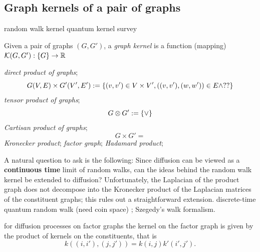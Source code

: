 \subsection{Graph kernels of a pair of graphs}
random walk kernel
\cite{vishwanathanGraphKernels2010}
quantum kernel
\cite{baiQuantumJensenShannon2015}
survey
\cite{kriegeSurveyGraphKernels2020}
\begin{definition}\label{def:graph_kernel}
	Given a pair of graphs $(G,G')$,
	a \emph{graph kernel} is a function (mapping)
	$\mathcal{K}(G,G'): \qty{ G} \to \mathbb{R}$
\end{definition}
\cite{chungSpectralGraphTheory1997}
\begin{definition}\label{def:product_graphs}
	\emph{direct product of graphs};
	\begin{equation}
		G(V,E)\times G'(V',E') 
		: = \qty{(v,v')\in V\times V',((v,v'),(w,w'))\in E \wedge??}
	\end{equation}
	\emph{tensor product of graphs};
	\begin{equation}
		G\otimes G' := \qty{ \vee }
	\end{equation}
	\emph{Cartisan product of graphs};
	\begin{equation}
		G\times G' = \qty{}
	\end{equation}
	\emph{Kronecker product};
	\emph{factor graph};
	\emph{Hadamard product};
\end{definition}
\begin{remark}
	A natural question to ask is the following: Since diffusion can be viewed as a \textbf{continuous time} limit of random walks, can the ideas behind the random walk kernel be extended to diffusion? Unfortunately, the Laplacian of the product graph does not decompose into the Kronecker product of the Laplacian matrices of the constituent graphs; this rules out a straightforward extension.
	discrete-time quantum random walk (need coin space) \cite{ambainisCoinsMakeQuantum2005} \cite{childsQuantumInformationProcessing2004};
	Szegedy's walk formalism.
	\cite{szegedySpectraQuantizedWalks2004}
\end{remark}
\begin{remark}
	for diﬀusion processes on factor graphs the kernel on the factor graph is given by the product of kernels on the constituents, that is 
	\begin{equation}
		k((i, i'), (j, j')) = k(i, j) k' (i' , j' ).
	\end{equation}
\end{remark}

